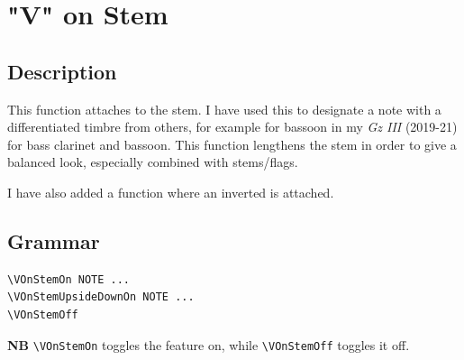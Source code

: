 \vfill \break




\section {"V" on Stem}
\hfill

\subsection{Description}
This function attaches  to the stem. I have used this to designate a note with a differentiated timbre from others, for example  for bassoon in my \textit{Gz III} (2019-21) for bass clarinet and bassoon. This function lengthens the stem in order to give a balanced look, especially combined with stems/flags. 

I have also added a function where an inverted  is attached. 
\subsection{Grammar}
\begin{verbatim}
\VOnStemOn NOTE ...
\VOnStemUpsideDownOn NOTE ...
\VOnStemOff
\end{verbatim}
\textbf{NB} \verb|\VOnStemOn| toggles the feature on, while \verb|\VOnStemOff| toggles it off.

